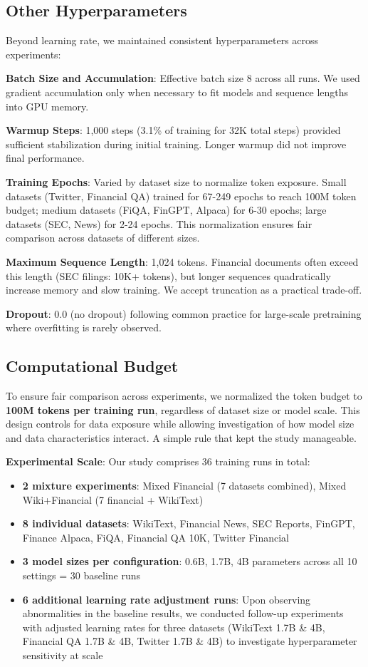 \subsection{Other Hyperparameters}

Beyond learning rate, we maintained consistent hyperparameters across experiments:

\textbf{Batch Size and Accumulation}: Effective batch size 8 across all runs. We used gradient accumulation only when necessary to fit models and sequence lengths into GPU memory.

\textbf{Warmup Steps}: 1,000 steps (3.1\% of training for 32K total steps) provided sufficient stabilization during initial training. Longer warmup did not improve final performance.

\textbf{Training Epochs}: Varied by dataset size to normalize token exposure. Small datasets (Twitter, Financial QA) trained for 67-249 epochs to reach 100M token budget; medium datasets (FiQA, FinGPT, Alpaca) for 6-30 epochs; large datasets (SEC, News) for 2-24 epochs. This normalization ensures fair comparison across datasets of different sizes.

\textbf{Maximum Sequence Length}: 1,024 tokens. Financial documents often exceed this length (SEC filings: 10K+ tokens), but longer sequences quadratically increase memory and slow training. We accept truncation as a practical trade-off.

\textbf{Dropout}: 0.0 (no dropout) following common practice for large-scale pretraining where overfitting is rarely observed.

\subsection{Computational Budget}

To ensure fair comparison across experiments, we normalized the token budget to \textbf{100M tokens per training run}, regardless of dataset size or model scale. This design controls for data exposure while allowing investigation of how model size and data characteristics interact. A simple rule that kept the study manageable.

\textbf{Experimental Scale}: Our study comprises 36 training runs in total:
\begin{itemize}
    \item \textbf{2 mixture experiments}: Mixed Financial (7 datasets combined), Mixed Wiki+Financial (7 financial + WikiText)
    \item \textbf{8 individual datasets}: WikiText, Financial News, SEC Reports, FinGPT, Finance Alpaca, FiQA, Financial QA 10K, Twitter Financial
    \item \textbf{3 model sizes per configuration}: 0.6B, 1.7B, 4B parameters across all 10 settings = 30 baseline runs
    \item \textbf{6 additional learning rate adjustment runs}: Upon observing abnormalities in the baseline results, we conducted follow-up experiments with adjusted learning rates for three datasets (WikiText 1.7B \& 4B, Financial QA 1.7B \& 4B, Twitter 1.7B \& 4B) to investigate hyperparameter sensitivity at scale
\end{itemize}

